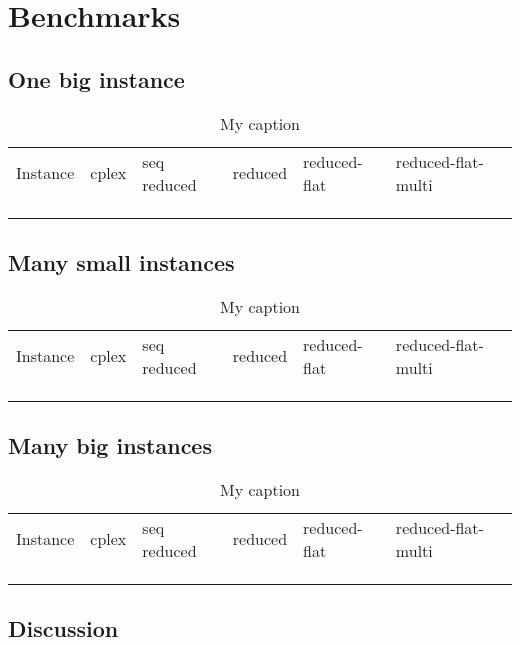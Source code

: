\section{Benchmarks}
\subsection{One big instance}

\begin{table}[]
	\centering
	\caption{My caption}
	\label{my-label}
	\begin{tabular}{llllll}
		Instance & cplex & seq reduced & reduced & reduced-flat & reduced-flat-multi \\
		&       &             &         &              &                    \\
		&       &             &         &              &                    \\
		&       &             &         &              &                   
	\end{tabular}
\end{table}

\subsection{Many small instances}
\begin{table}[]
	\centering
	\caption{My caption}
	\label{my-label}
	\begin{tabular}{llllll}
		Instance & cplex & seq reduced & reduced & reduced-flat & reduced-flat-multi \\
		&       &             &         &              &                    \\
		&       &             &         &              &                    \\
		&       &             &         &              &                   
	\end{tabular}
\end{table}

\subsection{Many big instances}
\begin{table}[]
	\centering
	\caption{My caption}
	\label{my-label}
	\begin{tabular}{llllll}
		Instance & cplex & seq reduced & reduced & reduced-flat & reduced-flat-multi \\
		&       &             &         &              &                    \\
		&       &             &         &              &                    \\
		&       &             &         &              &                   
	\end{tabular}
\end{table}

\subsection{Discussion}